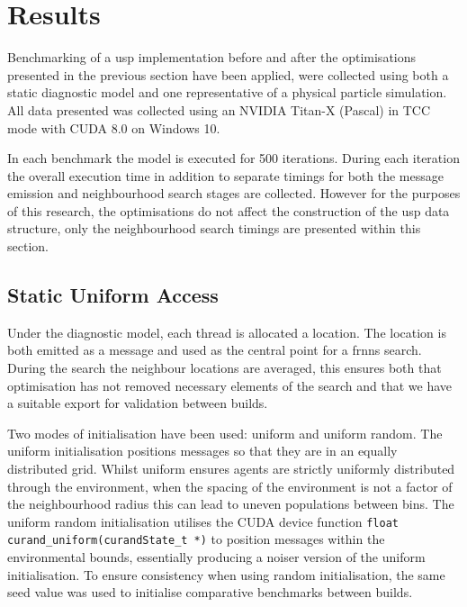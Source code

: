 \section{Results\label{sec:results}}
  
  Benchmarking of a \gls{usp} implementation before and after the optimisations presented in the previous section have been applied, were collected using both a static diagnostic model and one representative of a physical particle simulation. All data presented was collected using an NVIDIA Titan-X (Pascal) in TCC mode with CUDA 8.0 on Windows 10.
  
  In each benchmark the model is executed for 500 iterations. During each iteration the overall execution time in addition to separate timings for both the message emission and neighbourhood search stages are collected. However for the purposes of this research, the optimisations do not affect the construction of the \gls{usp} data structure, only the neighbourhood search timings are presented within this section.
  
  \subsection{Static Uniform Access}
    Under the diagnostic model, each thread is allocated a location. The location is both emitted as a message and used as the central point for a \gls{frnns} search. During the search the neighbour locations are averaged, this ensures both that optimisation has not removed necessary elements of the search and that we have a suitable export for validation between builds.
  
    Two modes of initialisation have been used: uniform and uniform random. The uniform initialisation positions messages so that they are in an equally distributed grid. Whilst uniform ensures agents are strictly uniformly distributed through the environment, when the spacing of the environment is not a factor of the neighbourhood radius this can lead to uneven populations between bins. The uniform random initialisation utilises the CUDA device function \lstinline{float curand_uniform(curandState_t *)} to position messages within the environmental bounds, essentially producing a noiser version of the uniform initialisation. To ensure consistency when using random initialisation, the same seed value was used to initialise comparative benchmarks between builds.
    

